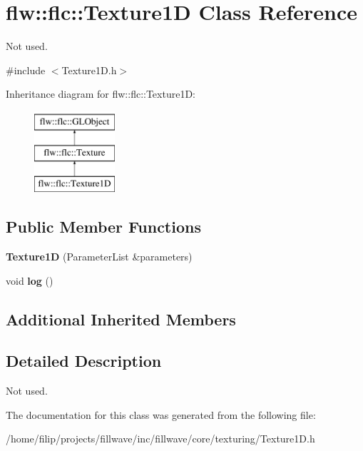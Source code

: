 \hypertarget{classflw_1_1flc_1_1Texture1D}{}\section{flw\+:\+:flc\+:\+:Texture1D Class Reference}
\label{classflw_1_1flc_1_1Texture1D}


Not used.  




{\ttfamily \#include $<$Texture1\+D.\+h$>$}

Inheritance diagram for flw\+:\+:flc\+:\+:Texture1D\+:\begin{figure}[H]
\begin{center}
\leavevmode
\includegraphics[height=3.000000cm]{classflw_1_1flc_1_1Texture1D}
\end{center}
\end{figure}
\subsection*{Public Member Functions}
\begin{DoxyCompactItemize}
\item 
\mbox{\label{classflw_1_1flc_1_1Texture1D_afe75a5423103cfb21e5369bdb8651875}} 
{\bfseries Texture1D} (Parameter\+List \&parameters)
\item 
\mbox{\label{classflw_1_1flc_1_1Texture1D_a475479ca8453099d25315dad60c7b279}} 
void {\bfseries log} ()
\end{DoxyCompactItemize}
\subsection*{Additional Inherited Members}


\subsection{Detailed Description}
Not used. 

The documentation for this class was generated from the following file\+:\begin{DoxyCompactItemize}
\item 
/home/filip/projects/fillwave/inc/fillwave/core/texturing/Texture1\+D.\+h\end{DoxyCompactItemize}
